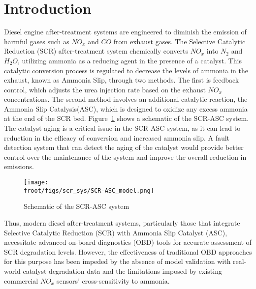 \section{Introduction}

Diesel engine after-treatment systems are engineered to diminish the emission of harmful gases such as $NO_x$ and $CO$
from exhaust gases. The Selective Catalytic Reduction (SCR) after-treatment system chemically converts $NO_x$ into $N_2$
and $H_2O$, utilizing ammonia as a reducing agent in the presence of a catalyst. This catalytic conversion process is
regulated to decrease the levels of ammonia in the exhaust, known as Ammonia Slip, through two methods. The first is
feedback control, which adjusts the urea injection rate based on the exhaust $NO_x$ concentrations. The second method
involves an additional catalytic reaction, the Ammonia Slip Catalysis(ASC), which is designed to oxidize any excess
ammonia at the end of the SCR bed. Figure~\ref{fig:exhaust_scheme} shows a schematic of the SCR-ASC system. The catalyst
aging is a critical issue in the SCR-ASC system, as it can lead to reduction in the efficacy of conversion and increased
ammonia slip. A fault detection system that can detect the aging of the catalyst would provide better control over the
maintenance of the system and improve the overall reduction in emissions.

\begin{figure}[ht]
    \centering
    \texttt{[image: \\froot/figs/scr\_sys/SCR-ASC\_model.png]}
    \caption{Schematic of the SCR-ASC system}
    \label{fig:exhaust_scheme}
\end{figure}


Thus, modern diesel after-treatment systems, particularly those that integrate Selective Catalytic Reduction (SCR) with
Ammonia Slip Catalyst (ASC), necessitate advanced on-board diagnostics (OBD) tools for accurate assessment of SCR
degradation levels. However, the effectiveness of traditional OBD approaches for this purpose has been impeded by the
absence of model validation with real-world catalyst degradation data and the limitations imposed by existing commercial
$NO_x$ sensors' cross-sensitivity to ammonia.

